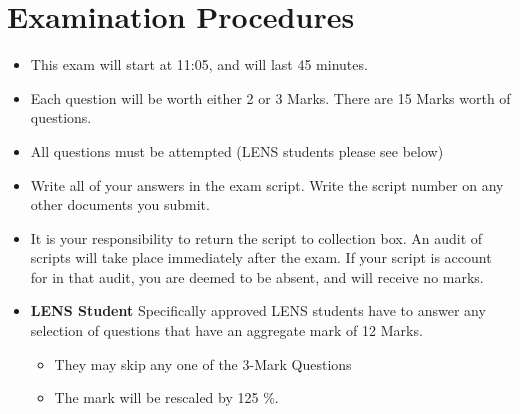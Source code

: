\documentclass[]{article}
\begin{document}
	
	\newpage
	\section*{Examination Procedures}
	
	\begin{itemize} 
		\item This exam will start at 11:05, and will last 45 minutes.
		
		\item Each question will be worth either 2 or 3 Marks. There are 15 Marks worth of questions.
		\item All questions must be attempted (LENS students please see below)
		
		\item Write all of your answers in the exam script. Write the script number on any other documents you submit.
		
		\item It is your responsibility to return the script to collection box. An audit of scripts will take place immediately after the exam. If your script is account for in that audit,  you are deemed to be absent, and will receive no marks.
		
		\item \textbf{LENS Student}
		Specifically approved LENS students have to answer any selection of questions that have an aggregate mark of 12 Marks.  
		\begin{itemize}
			\item They may skip any one of the 3-Mark Questions
			\item The mark will be rescaled by 125 \%.
		\end{itemize}
		
		
	\end{itemize}
\newpage
\end{document}
